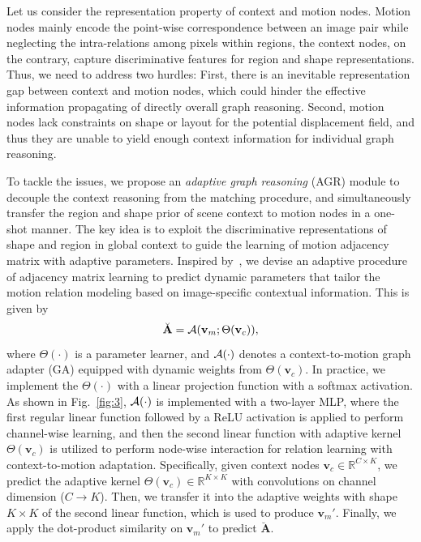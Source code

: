 \documentclass[letterpaper]{article} %
\begin{document}
Let us consider the representation property of context and motion nodes. Motion nodes mainly encode the point-wise correspondence between an image pair while neglecting the intra-relations among pixels within regions, the context nodes, on the contrary, capture discriminative features for region and shape representations. Thus, we need to address two hurdles: First,
there is an inevitable representation gap between context and motion nodes, which could hinder the effective information propagating of directly overall graph reasoning. Second, motion nodes lack constraints on shape or layout for the potential displacement field, and thus they are unable to yield enough context information for individual graph reasoning.

To tackle the issues, we propose an {\em adaptive graph reasoning} (AGR) module to decouple the context reasoning from the matching procedure, and simultaneously transfer the region and shape prior of scene context to motion nodes in a one-shot manner. The key idea is to exploit the discriminative representations of shape and region in global context to guide the learning of motion adjacency matrix with adaptive parameters. Inspired by~\cite{Bertinetto2016LearningFO}, we devise an adaptive procedure of adjacency matrix learning to predict dynamic parameters that tailor the motion relation modeling based on image-specific contextual information. This is given by
\begin{equation}
\breve{\mathbf A} = {\cal A}({\mathbf v}_m ; \Theta({\mathbf v}_c)),
\end{equation}
where $\Theta(\cdot)$ is a parameter learner, and ${\cal A}(\cdot)$ denotes a context-to-motion graph adapter (GA) equipped with dynamic weights from $\Theta({\mathbf v}_c)$. In practice, we implement the $\Theta(\cdot)$ with a linear projection function with a softmax activation. As shown in Fig.~\ref{fig:3}, ${\cal A}(\cdot)$ is implemented with a two-layer MLP, where the first regular linear function followed by a ReLU activation is applied to perform channel-wise learning, and then the second linear function with adaptive kernel $\Theta({\mathbf v}_c)$ is utilized to perform node-wise interaction for relation learning with context-to-motion adaptation. Specifically, given context nodes ${\mathbf v}_c \in \mathbb{R}^{C \times K}$, we predict the adaptive kernel $\Theta({\mathbf v}_c) \in \mathbb{R}^{K \times K}$ with convolutions on channel dimension ($C \rightarrow K$). Then, we transfer it into the adaptive weights with shape $K \times K$ of the second linear function, which is used to produce ${{\mathbf v}_m}'$. Finally, we apply the dot-product similarity on ${{\mathbf v}_m}'$ to predict $\breve{\mathbf A}$.
\end{document}
